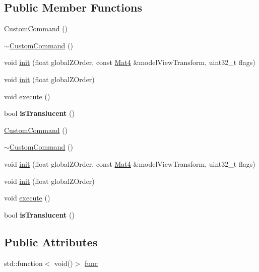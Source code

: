 \subsection*{Public Member Functions}
\begin{DoxyCompactItemize}
\item 
\hyperlink{classCustomCommand_a691e7a5f2b5148b2c38770ffc3fd8583}{Custom\+Command} ()
\item 
\hyperlink{classCustomCommand_a496664561533d0ba30f2675e4072cf72}{$\sim$\+Custom\+Command} ()
\item 
void \hyperlink{classCustomCommand_a28608e4e95264ed37f58df5e0fd01e0a}{init} (float global\+Z\+Order, const \hyperlink{classMat4}{Mat4} \&model\+View\+Transform, uint32\+\_\+t flags)
\item 
void \hyperlink{classCustomCommand_a8dacb9d20949e6d7079e4f56038bd72f}{init} (float global\+Z\+Order)
\item 
void \hyperlink{classCustomCommand_a743015d8ff6e36abd3916927f45c1fe1}{execute} ()
\item 
\mbox{\label{classCustomCommand_ad104a95f95f2df2f982b828a97451903}} 
bool {\bfseries is\+Translucent} ()
\item 
\hyperlink{classCustomCommand_a885265a8f126faf279ecfbce348c93e3}{Custom\+Command} ()
\item 
\hyperlink{classCustomCommand_a496664561533d0ba30f2675e4072cf72}{$\sim$\+Custom\+Command} ()
\item 
void \hyperlink{classCustomCommand_a28608e4e95264ed37f58df5e0fd01e0a}{init} (float global\+Z\+Order, const \hyperlink{classMat4}{Mat4} \&model\+View\+Transform, uint32\+\_\+t flags)
\item 
void \hyperlink{classCustomCommand_a8dacb9d20949e6d7079e4f56038bd72f}{init} (float global\+Z\+Order)
\item 
void \hyperlink{classCustomCommand_a743015d8ff6e36abd3916927f45c1fe1}{execute} ()
\item 
\mbox{\label{classCustomCommand_ad104a95f95f2df2f982b828a97451903}} 
bool {\bfseries is\+Translucent} ()
\end{DoxyCompactItemize}
\subsection*{Public Attributes}
\begin{DoxyCompactItemize}
\item 
std\+::function$<$ void()$>$ \hyperlink{classCustomCommand_aeb108aa0988bda558eec38f36f409114}{func}
\end{DoxyCompactItemize}
